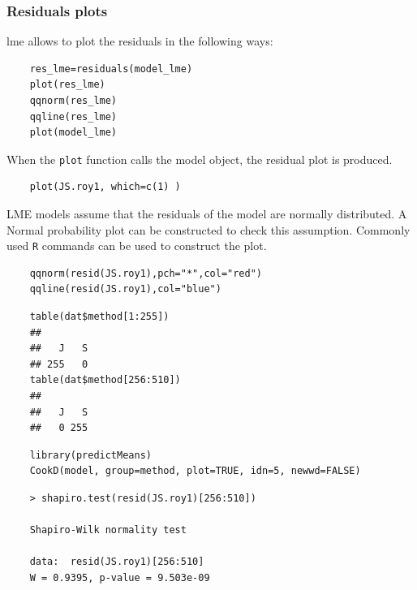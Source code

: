 \documentclass[Main.tex]{subfiles}
\begin{document}
\subsubsection{Residuals plots}

lme allows to plot the residuals in the following ways:

\begin{framed}
	\begin{verbatim}
	res_lme=residuals(model_lme)
	plot(res_lme)
	qqnorm(res_lme)
	qqline(res_lme)
	plot(model_lme)
	\end{verbatim}
\end{framed}

When the \texttt{plot} function calls the model object, the residual plot is produced.




\begin{framed}
	\begin{verbatim}
	plot(JS.roy1, which=c(1) )
	\end{verbatim}
\end{framed}

LME models assume that the residuals of the model are normally distributed. A Normal probability plot can be constructed to check this assumption. Commonly used \texttt{R} commands can be used to construct the plot.


\begin{framed}
	\begin{verbatim}
	qqnorm(resid(JS.roy1),pch="*",col="red")
	qqline(resid(JS.roy1),col="blue")
	\end{verbatim}
\end{framed}

\begin{framed}
	\begin{verbatim}
	table(dat$method[1:255])
	## 
	##   J   S 
	## 255   0
	table(dat$method[256:510])
	## 
	##   J   S 
	##   0 255
	\end{verbatim}	
\end{framed}
\begin{framed}
	\begin{verbatim}
	library(predictMeans)
	CookD(model, group=method, plot=TRUE, idn=5, newwd=FALSE)
	\end{verbatim}
\end{framed}






\begin{framed}
	\begin{verbatim}
	> shapiro.test(resid(JS.roy1)[256:510])
	
	Shapiro-Wilk normality test
	
	data:  resid(JS.roy1)[256:510]
	W = 0.9395, p-value = 9.503e-09
	\end{verbatim}
\end{framed}
%		
\end{document}
